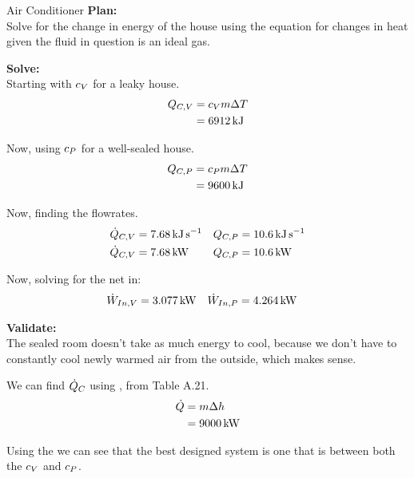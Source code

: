 \begin{example}{Air Conditioner}
  \textbf{Plan:} \\
  Solve for the change in energy of the house using the equation for changes in heat given the fluid in question is an ideal gas.

  \textbf{Solve:} \\
  Starting with $c_{V}$ for a leaky house.
  \begin{align*}
    Q_{C, V} &= c_{V} m \Delta T \\
    &= \SI{6912}{\kilo\joule}
  \end{align*}

  Now, using $c_{P}$ for a well-sealed house.
  \begin{align*}
    Q_{C, P} &= c_{P} m \Delta T \\
    &= \SI{9600}{\kilo\joule}
  \end{align*}

  Now, finding the flowrates.
  \begin{align*}
    \dot{Q}_{C, V} &= \SI{7.68}{\kilo\joule\per\second} & Q_{C, P} &= \SI{10.6}{\kilo\joule\per\second} \\
    \dot{Q}_{C, V} &= \SI{7.68}{\kilo\watt} & Q_{C, P} &= \SI{10.6}{\kilo\watt} \\
  \end{align*}

  Now, solving for the net  in:
  \begin{align*}
    \dot{W}_{In, V} &= \SI{3.077}{\kilo\watt} & \dot{W}_{In, P} &= \SI{4.264}{\kilo\watt}
  \end{align*}

  \textbf{Validate:} \\
  The sealed room doesn't take as much energy to cool, because we don't have to constantly cool newly warmed air from the outside, which makes sense.

  We can find $\dot{Q}_{C}$ using , from Table A.21.
  \begin{align*}
    \dot{Q} &= m \Delta h \\
                     &= \SI{9000}{\kilo\watt}
  \end{align*}

  Using the  we can see that the best designed system is one that is between both the $c_{V}$ and $c_{P}$.
\end{example}

